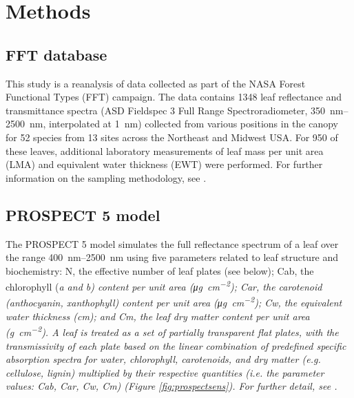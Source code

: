 \section{Methods} \label{s:methods}

\subsection{FFT database} \label{ss:m-fft-database} 

This study is a reanalysis of data collected as part of the NASA Forest
Functional Types (FFT) campaign.  The data contains 1348 leaf reflectance and
transmittance spectra (ASD Fieldspec 3 Full Range Spectroradiometer,
\SIrange{350}{2500}{\nano\meter}, interpolated at \SI{1}{\nano\meter})
collected from various positions in the canopy for 52 species from 13 sites
across the Northeast and Midwest USA. For 950 of these leaves, additional
laboratory measurements of leaf mass per unit area (LMA) and equivalent water
thickness (EWT) were performed. For further information on the sampling
methodology, see \cite{Singh2015}.

\subsection{PROSPECT 5 model} \label{ss:m-prospect5}

The PROSPECT 5 model simulates the full reflectance spectrum of a leaf over
the range \SIrange{400}{2500}{\nano\meter} using five parameters related to
leaf structure and biochemistry: N, the effective number of leaf plates (see
below); Cab, the chlorophyll (\em{a} and \em{b}) content per unit area
(\si{\micro\gram\per\square\centi\meter}); Car, the carotenoid (anthocyanin,
xanthophyll) content per unit area (\si{\micro\gram\per\square\centi\meter});
Cw, the equivalent water thickness (\si{\centi\meter}); and Cm, the leaf dry
matter content per unit area (\si{\gram\per\square\centi\meter}). A leaf is
treated as a set of partially transparent flat plates, with the transmissivity
of each plate based on the linear combination of predefined specific
absorption spectra for water, chlorophyll, carotenoids, and dry matter (e.g.
cellulose, lignin) multiplied by their respective quantities (i.e. the
parameter values: Cab, Car, Cw, Cm) (Figure \ref{fig:prospectsens}). For
further detail, see \cite{Jacquemoud1990, Feret2008}.

